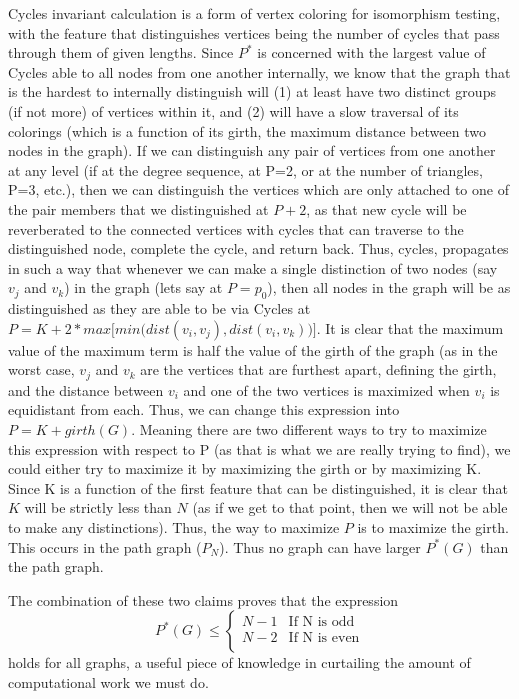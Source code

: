 Cycles invariant calculation is a form of vertex coloring for isomorphism testing, with the feature that distinguishes vertices being the number of cycles that pass through them of given lengths.
Since $P^*$ is concerned with the largest value of Cycles able to all nodes from one another internally, we know that the graph that is the hardest to internally distinguish will (1) at least have two distinct groups (if not more) of vertices within it, and (2) will have a slow traversal of its colorings (which is a function of its girth, the maximum distance between two nodes in the graph).
If we can distinguish any pair of vertices from one another at any level (if at the degree sequence, at P=2, or at the number of triangles, P=3, etc.), then we can distinguish the vertices which are only attached to one of the pair members that we distinguished at $P+2$, as that new cycle will be reverberated to the connected vertices with cycles that can traverse to the distinguished node, complete the cycle, and return back.
Thus, cycles, propagates in such a way that whenever we can make a single distinction of two nodes (say $v_j$ and $v_k$) in the graph (lets say at $P=p_0$), then all nodes in the graph will be as distinguished as they are able to be via Cycles at $P=K+2*max\big[min\big(dist(v_i,v_j), dist(v_i,v_k)\big)\big]$.
It is clear that the maximum value of the maximum term is half the value of the girth of the graph (as in the worst case, $v_j$ and $v_k$ are the vertices that are furthest apart, defining the girth, and the distance between $v_i$ and one of the two vertices is maximized when $v_i$ is equidistant from each. 
Thus, we can change this expression into $P=K+girth(G)$.
Meaning there are two different ways to try to maximize this expression with respect to P (as that is what we are really trying to find), we could either try to maximize it by maximizing the girth or by maximizing K.
Since K is a function of the first feature that can be distinguished, it is clear that $K$ will be strictly less than $N$ (as if we get to that point, then we will not be able to make any distinctions).
Thus, the way to maximize $P$ is to maximize the girth.
This occurs in the path graph ($P_N$).
Thus no graph can have larger $P^*(G)$ than the path graph.

The combination of these two claims proves that the expression 
\[ P^*(G) \leq \begin{cases} 
      N-1 & \text{If N is odd} \\
      N-2 & \text{If N is even} \\
   \end{cases}
\]
holds for all graphs, a useful piece of knowledge in curtailing the amount of computational work we must do. 

